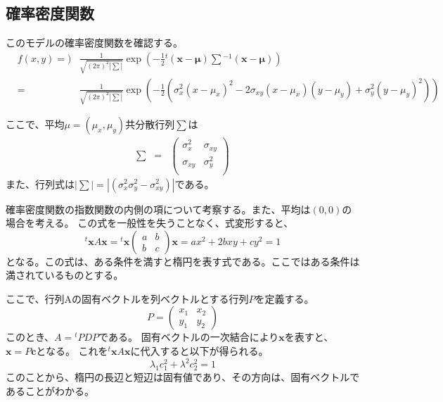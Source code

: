 \subsection{確率密度関数}
このモデルの確率密度関数を確認する。
\begin{eqnarray*}
 &f(x,y)=)& \frac{1}{\sqrt{(2\pi)^2|\sum|}} \exp\left( -\frac{1}{2} {}^t\!(\bm{x-\mu})\sum\! ^{-1}(\bm{x-\mu}) \right) \\
 &= &\frac{1}{\sqrt{(2\pi)^2|\sum|}} \exp\left( -\frac{1}{2}  \left(\sigma_x^2(x-\mu_x)^2 -2\sigma_{xy}(x-\mu_x)(y-\mu_y)+\sigma_y^2(y-\mu_y)^2\right) \right)
\end{eqnarray*}


ここで、平均$\mu=(\mu_x,\mu_y)$共分散行列$\sum$は
\begin{eqnarray*}
 \sum &=& \begin{pmatrix}
\sigma_x^2 &  \sigma_{xy}\\
           \sigma_{xy}& \sigma_y^2 \\
\end{pmatrix}
\end{eqnarray*}
また、行列式は$|\sum| = |(\sigma_x^2\sigma_y^2-\sigma_{xy}^2)|$である。


確率密度関数の指数関数の内側の項について考察する。また、平均は$(0,0)$の場合を考える。
この式を一般性を失うことなく、式変形すると、
\begin{equation*}
 {}^t\!\bm{x}A\bm{x}=
 {}^t\!\bm{x}\begin{pmatrix}
  a & b \\
  b & c 
 \end{pmatrix}\bm{x}= ax^2+2bxy+cy^2 = 1
\end{equation*}
となる。この式は、ある条件を満すと楕円を表す式である。ここではある条件は満されているものとする。



ここで、行列Aの固有ベクトルを列ベクトルとする行列$P$を定義する。
\begin{equation*}
 P = \begin{pmatrix}
      x_1 & x_2\\
      y_1 & y_2
     \end{pmatrix}
\end{equation*}
このとき、$A={}^t\!PDP$である。
固有ベクトルの一次結合により$\bm{x}$を表すと、$\bm{x}=P\bm{c}$となる。
これを${}^t\!\bm{x}A\bm{x}$に代入すると以下が得られる。
\begin{equation*}
 \lambda_1 c_1^2+\lambda^2 c_2^2=1
\end{equation*}
このことから、楕円の長辺と短辺は固有値であり、その方向は、固有ベクトルであることがわかる。



